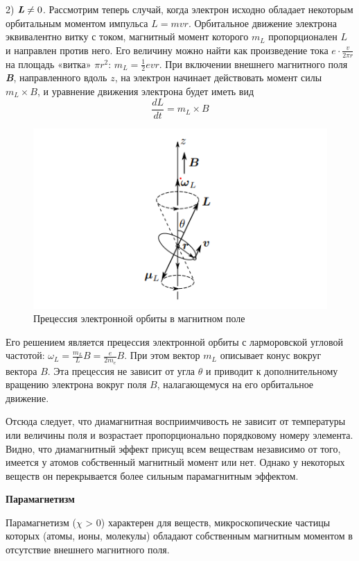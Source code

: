 \documentclass[a4paper,12pt]{article}
\begin{document}
2) $\textit{\textbf{L}} \neq 0$. Рассмотрим теперь случай, когда электрон исходно обладает некоторым орбитальным моментом импульса $L = mvr$. Орбитальное движение электрона эквивалентно витку с током, магнитный момент которого $m_L$ пропорционален $L$ и направлен против него. Его величину можно найти как
произведение тока $e \cdot \frac{v}{2 \pi r}$ на площадь «витка» $\pi r^2$: $m_L = \frac{1}{2} e v r$. При включении внешнего магнитного поля \textit{\textbf{B}}, направленного вдоль $z$, на электрон начинает действовать момент силы  $m_L \times B$, и уравнение движения электрона  будет иметь вид
\[\frac{dL}{dt} = m_L \times B\]

\begin{figure}[H]\label{fig: Прецессия электрона}
    \centering
    \includegraphics[width = 0.8 \textwidth]{Прецессия электрона.png}
    \caption{Прецессия электронной орбиты в магнитном поле}
\end{figure}
Его решением является прецессия электронной орбиты с ларморовской угловой частотой: $\omega_L = \frac{m_L}{L} B = \frac{e}{2 m_e}B$. При этом вектор $m_L$ описывает конус вокруг вектора $B$. Эта прецессия
не зависит от угла $\theta$ и приводит к дополнительному вращению электрона
вокруг поля $B$, налагающемуся на его орбитальное движение.

Отсюда следует, что диамагнитная восприимчивость не
зависит от температуры или величины поля и возрастает пропорционально порядковому номеру элемента. Видно, что диамагнитный эффект присущ всем веществам независимо от того, имеется у атомов собственный магнитный момент или нет. Однако у некоторых веществ он перекрывается более сильным парамагнитным эффектом.

\textbf{Парамагнетизм}

Парамагнетизм ($\chi$ > 0) характерен для веществ, микроскопические частицы которых (атомы, ионы, молекулы) обладают собственным магнитным моментом в отсутствие внешнего магнитного поля. 
\end{document}
